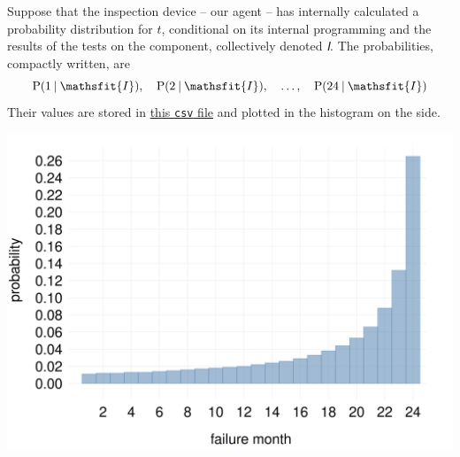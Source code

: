 \documentclass[
  a4paper,
  DIV=11,
  numbers=noendperiod,
  oneside]{scrreprt}
\begin{document}
Suppose that the inspection device -- our agent -- has internally
calculated a probability distribution for \(t\), conditional on its
internal programming and the results of the tests on the component,
collectively denoted {\(\mathsfit{I}\).} The probabilities, compactly
written, are \[
\mathrm{P}(1 \nonscript\:\vert\nonscript\:\mathopen{}\mathsfit{I}), \quad
\mathrm{P}(2 \nonscript\:\vert\nonscript\:\mathopen{}\mathsfit{I}), \quad
\dotsc, \quad
\mathrm{P}(24 \nonscript\:\vert\nonscript\:\mathopen{}\mathsfit{I})
\] Their values are stored in
\href{datasets/failure_probability.csv}{this \texttt{csv} file} and
plotted in the histogram on the side.

\begin{marginfigure}

{\centering \includegraphics[width=1\textwidth,height=\textheight]{failure_probabilities.png}

}

\end{marginfigure}
\end{document}
